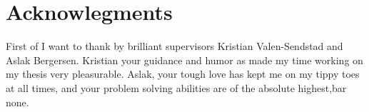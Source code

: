 \chapter{Acknowlegments}
First of I want to thank by brilliant supervisors Kristian Valen-Sendstad and Aslak Bergersen. Kristian your guidance and humor as made my time working on my thesis very pleasurable. Aslak, your tough love has kept me on my tippy toes at all times, and your problem solving abilities are of the absolute highest,bar none. 											